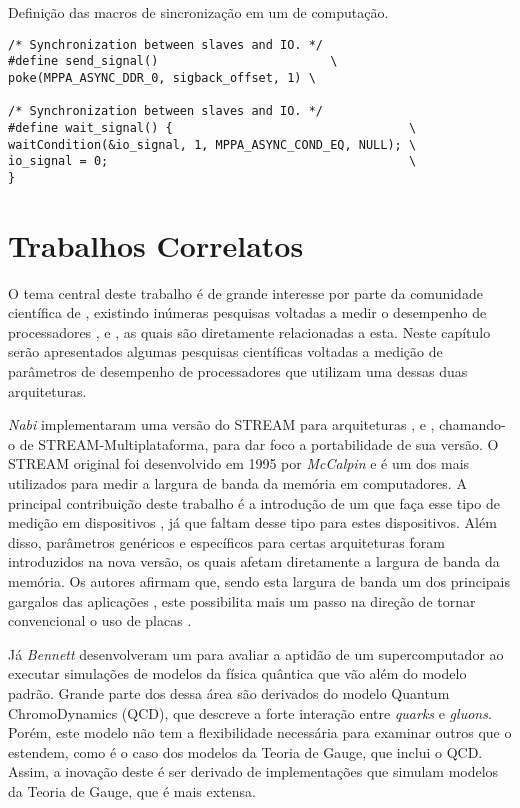 \begin{listing}[tb]
\caption{Definição das macros de sincronização em um \cluster de computação.}
\label{lst:macrossynccc}
\begin{verbatim}
/* Synchronization between slaves and IO. */
#define send_signal()                        \
poke(MPPA_ASYNC_DDR_0, sigback_offset, 1) \

/* Synchronization between slaves and IO. */
#define wait_signal() {                                 \
waitCondition(&io_signal, 1, MPPA_ASYNC_COND_EQ, NULL); \
io_signal = 0;                                          \
}     
\end{verbatim}
\fonte{o autor.}
\end{listing}

\chapter{Trabalhos Correlatos}
\label{ch:trabcorrelatos}

O tema central deste trabalho é de grande interesse por parte da comunidade científica de \HPC, existindo inúmeras pesquisas voltadas a medir o desempenho de processadores \multicore, \manycore e \chips \FPGA, as quais são diretamente relacionadas a esta. Neste capítulo serão apresentados algumas pesquisas científicas voltadas a medição de parâmetros de desempenho de processadores que utilizam uma dessas duas arquiteturas.

\textit{Nabi} \etal \cite{nabifpgabenchmark} implementaram uma versão do \bench STREAM para arquiteturas \FPGA, \GPUs e \CPUs, chamando-o de STREAM-Multiplataforma, para dar foco a portabilidade de sua versão. O \bench STREAM original foi desenvolvido em 1995 por \textit{McCalpin} \etal \cite{mccalpinstreambench} e é um dos \benchs mais utilizados para medir a largura de banda da memória em computadores. A principal contribuição deste trabalho é a introdução de um \bench que faça esse tipo de medição em dispositivos \FPGA, já que faltam \benchs desse tipo para estes dispositivos. Além disso, parâmetros genéricos e específicos para certas arquiteturas foram introduzidos na nova versão, os quais afetam diretamente a largura de banda da memória. Os autores afirmam que, sendo esta largura de banda um dos principais gargalos das aplicações \HPC \cite{asanoviclandscapeparallel}, este \bench possibilita mais um passo na direção de tornar convencional o uso de placas \FPGA.

Já \textit{Bennett} \etal \cite{bennettqcdbench} desenvolveram um \bench para avaliar a aptidão de um supercomputador ao executar simulações de modelos da física quântica que vão além do modelo padrão. Grande parte dos \benchs dessa área são derivados do modelo Quantum ChromoDynamics (QCD), que descreve a forte interação entre \textit{quarks} e \textit{gluons}. Porém, este modelo não tem a flexibilidade necessária para examinar outros que o estendem, como é o caso dos modelos da Teoria de Gauge, que inclui o QCD. Assim, a inovação deste \bench é ser derivado de implementações que simulam modelos da Teoria de Gauge, que é mais extensa. 


